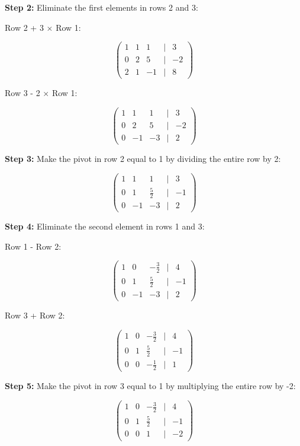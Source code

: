 \textbf{Step 2:} Eliminate the first elements in rows 2 and 3:

Row 2 + 3 \(\times\) Row 1:

\[
    \begin{pmatrix}
    1 & 1 & 1 & | & 3 \\
    0 & 2 & 5 & | & -2 \\
    2 & 1 & -1 & | & 8
    \end{pmatrix}
\]

Row 3 - 2 \(\times\) Row 1:

\[
    \begin{pmatrix}
    1 & 1 & 1 & | & 3 \\
    0 & 2 & 5 & | & -2 \\
    0 & -1 & -3 & | & 2
    \end{pmatrix}
\]

\textbf{Step 3:} Make the pivot in row 2 equal to 1 by dividing the entire row by 2:

\[
    \begin{pmatrix}
    1 & 1 & 1 & | & 3 \\
    0 & 1 & \frac{5}{2} & | & -1 \\
    0 & -1 & -3 & | & 2
    \end{pmatrix}
\]

\textbf{Step 4:} Eliminate the second element in rows 1 and 3:

Row 1 - Row 2:

\[
    \begin{pmatrix}
    1 & 0 & -\frac{3}{2} & | & 4 \\
    0 & 1 & \frac{5}{2} & | & -1 \\
    0 & -1 & -3 & | & 2
    \end{pmatrix}
\]

Row 3 + Row 2:

\[
    \begin{pmatrix}
    1 & 0 & -\frac{3}{2} & | & 4 \\
    0 & 1 & \frac{5}{2} & | & -1 \\
    0 & 0 & -\frac{1}{2} & | & 1
    \end{pmatrix}
\]

\textbf{Step 5:} Make the pivot in row 3 equal to 1 by multiplying the entire row by -2:

\[
    \begin{pmatrix}
    1 & 0 & -\frac{3}{2} & | & 4 \\
    0 & 1 & \frac{5}{2} & | & -1 \\
    0 & 0 & 1 & | & -2
    \end{pmatrix}
\]

